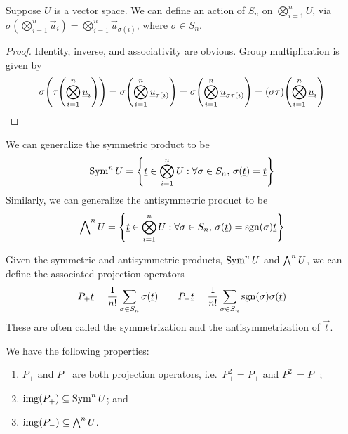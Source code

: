\begin{lemma}
    Suppose \(U\) is a vector space.
    We can define an action of \(S_n\) on \(\bigotimes_{i=1}^n U\),
    via \(\sigma(\bigotimes_{i=1}^n \vec{u}_i) = \bigotimes_{i=1}^n \vec{u}_{\sigma(i)}\),
    where \(\sigma \in S_n\).
\end{lemma}
\begin{proof}
    Identity, inverse, and associativity are obvious.
    Group multiplication is given by
    \begin{equation*}
        \sigma\pqty{\tau\pqty{\bigotimes_{i=1}^n \vec{u}_i}}
        = \sigma\pqty{\bigotimes_{i=1}^n \vec{u}_{\tau(i)}}
        = \sigma\pqty{\bigotimes_{i=1}^n \vec{u}_{\sigma\tau(i)}}
        = (\sigma\tau)\pqty{\bigotimes_{i=1}^n \vec{u}_i}
    \end{equation*}
\end{proof}
\begin{definition}
    We can generalize the symmetric product to be
    \begin{equation*}
        \Sym^n U = \Bqty{\vec{t} \in \bigotimes_{i=1}^n U: \forall\sigma \in S_n,\,\sigma(\vec{t}) = \vec{t}}
    \end{equation*}
    Similarly, we can generalize the antisymmetric product to be
    \begin{equation*}
        \Asym^n U = \Bqty{\vec{t} \in \bigotimes_{i=1}^n U: \forall\sigma \in S_n,\,\sigma(\vec{t}) = \sgn(\sigma)\vec{t}}
    \end{equation*}
\end{definition}
\begin{definition}
    Given the symmetric and antisymmetric products, \(\operatorname{Sym}^n U\) and \(\operatorname{{\bigwedge}}^n U\),
    we can define the associated projection operators
    \begin{equation*}
        P_+\underline{t} = \frac{1}{n!} \sum_{\sigma \in S_n} \sigma(\underline{t}) \qquad
        P_-\underline{t} = \frac{1}{n!} \sum_{\sigma \in S_n} \operatorname{sgn}(\sigma) \sigma(\underline{t})
    \end{equation*}
    These are often called the symmetrization and the antisymmetrization of \(\vec{t}\).
\end{definition}
\begin{lemma}
    We have the following properties:
    \begin{enumerate}[label={(\alph*)}, itemsep=0mm]
        \item \(P_+\) and \(P_-\) are both projection operators,
            i.e.\ \(P_+^2 = P_+\) and \(P_-^2 = P_-\);
        \item \(\operatorname{img}(P_+) \subseteq \operatorname{Sym}^n U\); and
        \item \(\operatorname{img}(P_-) \subseteq \operatorname{{\bigwedge}}^n U\).
    \end{enumerate}
\end{lemma}
